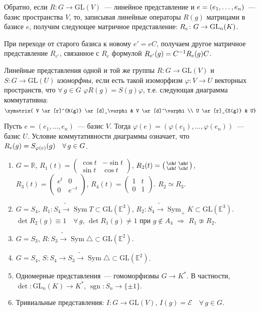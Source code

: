 \documentclass[a4paper]{article}
\newcommand{\Sym}{\mathop{\mathrm{Sym}}\nolimits}
\newcommand{\sgn}{\mathop{\mathrm{sgn}}\nolimits}
\newcommand*{\p}[1]{#1\nobreak\discretionary{}{\hbox{$\mathsurround=0pt #1$}}{}}
\begin{document}
Обратно, если $R\colon G\to \mathrm{GL}(V)$~--- линейное
представление и $e=(e_1,\p\ldots,e_n)$~--- базис пространства $V$,
то, записывая линейные операторы $R(g)$ матрицами в базисе $e$,
получим следующее матричное представление: $R_e\colon G\p\to
\mathrm{GL}_n(K)$.

При переходе от старого базиса к новому $e'=eC$, получаем другое
матричное представление $R_{e'}$, связанное с $R_e$ формулой
$R_{e'}(g)\p=C^{-1}R_e(g)C$.

Линейные представления одной и той же группы $R\colon G\to
\mathrm{GL}(V)$ и $S\colon G\to \mathrm{GL}(U)$ \emph{изоморфны},
если есть такой изоморфизм $\varphi\colon V\to U$ векторных
пространств, что $\forall \, g\in G$ \quad $\varphi
R(g)=S(g)\varphi$, т.е. следующая диаграмма коммутативна:
$$\xymatrix{
 V \ar[r]^{R(g)} \ar[d]_\varphi & V \ar[d]^\varphi\\
 U \ar[r]_{S(g)} & U}$$

Пусть $e=(e_1,\ldots,e_n)$~--- базис $V$. Тогда
$\varphi(e)=(\varphi(e_1),\ldots,\varphi(e_n))$~--- базис $U$.
Условие коммутативности диаграммы означает, что
$R_e(g)\p=S_{\varphi(e)}(g)\quad \forall \, g\in G$.

\prim
\begin{enumerate}
  \item $G=\mathbb{R}$, $R_1(t)=\left(\begin{smallmatrix}\cos t& -\sin t\\ \sin t& \cos
  t\end{smallmatrix}\right)$, $R_2(t)=\left(\begin{smallmatrix}\ch t& \sh t\\ \sh t& \ch
  t\end{smallmatrix}\right)$, $R_3(t)=\left(\begin{smallmatrix} e^t& 0\\ 0&
  e^{-t}\end{smallmatrix}\right)$, $R_4(t)=\left(\begin{smallmatrix} 1& t\\ 0 &
  1\end{smallmatrix}\right)$. $R_2\simeq R_3$.
  \item $G=S_4$, $R_1\colon S_4\widetilde{\to}\Sym T\subset
  \mathrm{GL}(\mathbb{E}^3)$, $R_2\colon S_4\widetilde{\to} \Sym_+K\subset
  \mathrm{GL}(\mathbb{E}^3)$. $\det R_2(g)\equiv 1\quad \forall \, g$, $\det
  R_1(g)\neq1$ при $g\not\in A_4$ $\Rightarrow$ $R_1\not\simeq R_2$.
  \item $G=S_3$, $R\colon S_3\widetilde{\to}\Sym\triangle\subset
  \mathrm{GL}(\mathbb{E}^2)$.
  \item $G=S_4$, $S\colon S_4\to S_3\widetilde{\to}\Sym\triangle\subset
  \mathrm{GL}(\mathbb{E}^2)$.
  \item Одномерные представления~--- гомоморфизмы $G\to K^*$. В
  частности, $\det\colon \mathrm{GL}_n(K)\to K^*$, $\sgn\colon S_n\to
  \{\pm1\}$.
  \item Тривиальные представления: $I\colon G\to \mathrm{GL}(V)$, $I(g)=\mathcal{E}\quad \forall \, g\in
  G$.
\end{enumerate}
\end{document}
